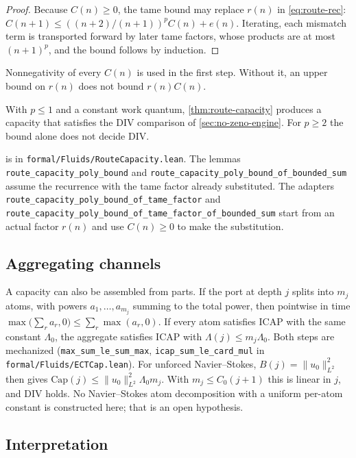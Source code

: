 \begin{proof}
Because $C(n)\ge0$, the tame bound may replace $r(n)$ in \eqref{eq:route-rec}:
$C(n+1)\le((n+2)/(n+1))^pC(n)+e(n)$. Iterating, each mismatch term is transported forward by later
tame factors, whose products are at most $(n+1)^p$, and the bound follows by induction.
\end{proof}

Nonnegativity of every $C(n)$ is used in the first step. Without it, an upper bound on $r(n)$ does
not bound $r(n)C(n)$.

With $p\le1$ and a constant work quantum, \cref{thm:route-capacity} produces a capacity that
satisfies the DIV comparison of \cref{sec:no-zeno-engine}. For $p\ge2$ the bound alone does not
decide DIV.

\begin{remark}[Mechanization]
 is in \nolinkurl{formal/Fluids/RouteCapacity.lean}. The lemmas
\nolinkurl{route_capacity_poly_bound} and \nolinkurl{route_capacity_poly_bound_of_bounded_sum}
assume the recurrence with the tame factor already substituted. The adapters
\nolinkurl{route_capacity_poly_bound_of_tame_factor} and
\nolinkurl{route_capacity_poly_bound_of_tame_factor_of_bounded_sum} start from an actual factor
$r(n)$ and use $C(n)\ge0$ to make the substitution.
\end{remark}

\subsection{Aggregating channels}

A capacity can also be assembled from parts. If the port at depth $j$ splits into $m_j$ atoms,
with powers $a_1,\dots,a_{m_j}$ summing to the total power, then pointwise in time
$\max\bigl(\sum_r a_r,0\bigr)\le\sum_r\max(a_r,0)$. If every atom satisfies ICAP with the same
constant $\Lambda_0$, the aggregate satisfies ICAP with $\Lambda(j)\le m_j\Lambda_0$. Both steps are
mechanized (\nolinkurl{max_sum_le_sum_max}, \nolinkurl{icap_sum_le_card_mul} in
\nolinkurl{formal/Fluids/ECTCap.lean}). For unforced Navier--Stokes, $B(j)=\|u_0\|_{L^2}^2$ then gives
$\mathrm{Cap}(j)\le\|u_0\|_{L^2}^2\Lambda_0 m_j$. With $m_j\le C_0(j+1)$ this is linear in $j$, and
DIV holds. No Navier--Stokes atom decomposition with a uniform per-atom constant is constructed
here; that is an open hypothesis.

\subsection{Interpretation}


